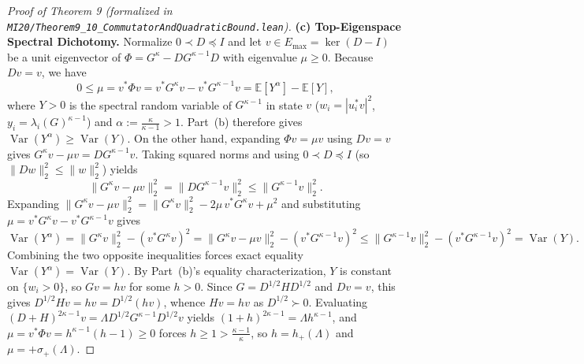 \documentclass[10pt,letterpaper]{article}
\begin{document}
\begin{proof}[Proof of Theorem 9 (formalized in \texttt{MI20/Theorem9\_10\_\allowbreak CommutatorAndQuadraticBound.lean})]
\textbf{(c) Top-Eigenspace Spectral Dichotomy.} Normalize $0 \prec D \preceq I$ and let $v \in E_{\max} = \ker(D - I)$ be a unit eigenvector of $\Phi = G^\kappa - D G^{\kappa-1} D$ with eigenvalue $\mu \ge 0$. Because $Dv = v$, we have
\[
  0 \le \mu = v^* \Phi v = v^* G^\kappa v - v^* G^{\kappa-1} v = \mathbb{E}[Y^\alpha] - \mathbb{E}[Y],
\]
where $Y > 0$ is the spectral random variable of $G^{\kappa-1}$ in state $v$ ($w_i = |u_i^* v|^2$, $y_i = \lambda_i(G)^{\kappa-1}$) and $\alpha := \frac{\kappa}{\kappa - 1} > 1$. Part~(b) therefore gives $\operatorname{Var}(Y^\alpha) \ge \operatorname{Var}(Y)$. On the other hand, expanding $\Phi v = \mu v$ using $D v = v$ gives $G^\kappa v - \mu v = D G^{\kappa-1} v$. Taking squared norms and using $0 \prec D \preceq I$ (so $\|D w\|_2^2 \le \|w\|_2^2$) yields
\[
  \|G^\kappa v - \mu v\|_2^2 = \|D G^{\kappa-1} v\|_2^2 \le \|G^{\kappa-1} v\|_2^2.
\]
Expanding $\|G^\kappa v - \mu v\|_2^2 = \|G^\kappa v\|_2^2 - 2\mu\, v^* G^\kappa v + \mu^2$ and substituting $\mu = v^* G^\kappa v - v^* G^{\kappa-1} v$ gives
\[
  \operatorname{Var}(Y^\alpha) = \|G^\kappa v\|_2^2 - (v^* G^\kappa v)^2
  = \|G^\kappa v - \mu v\|_2^2 - (v^* G^{\kappa-1} v)^2
  \le \|G^{\kappa-1} v\|_2^2 - (v^* G^{\kappa-1} v)^2
  = \operatorname{Var}(Y).
\]
Combining the two opposite inequalities forces exact equality $\operatorname{Var}(Y^\alpha) = \operatorname{Var}(Y)$. By Part~(b)'s equality characterization, $Y$ is constant on $\{w_i > 0\}$, so $G v = h v$ for some $h > 0$. Since $G = D^{1/2} H D^{1/2}$ and $D v = v$, this gives $D^{1/2} H v = h v = D^{1/2}(h v)$, whence $H v = h v$ as $D^{1/2} \succ 0$. Evaluating $(D + H)^{2\kappa-1} v = \Lambda D^{1/2} G^{\kappa-1} D^{1/2} v$ yields $(1 + h)^{2\kappa-1} = \Lambda h^{\kappa-1}$, and $\mu = v^* \Phi v = h^{\kappa-1}(h - 1) \ge 0$ forces $h \ge 1 > \frac{\kappa-1}{\kappa}$, so $h = h_+(\Lambda)$ and $\mu = +\sigma_+(\Lambda)$.
\end{proof}
\end{document}
